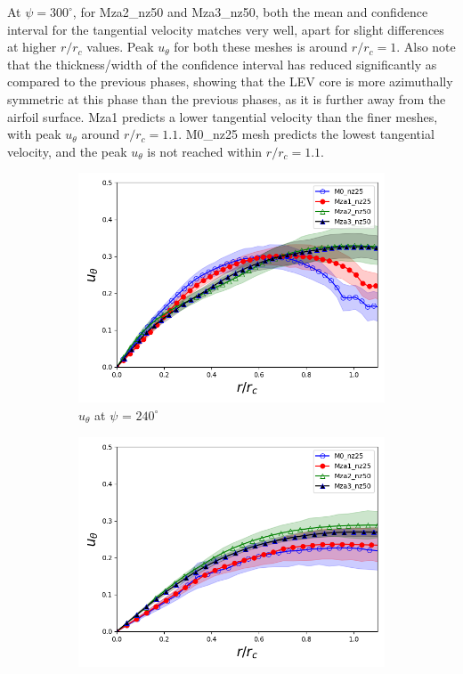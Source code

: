 At $\psi = 300^\circ$, for Mza2\_nz50 and Mza3\_nz50, both the mean and confidence interval for the tangential velocity matches very well, apart for slight differences at higher $r/r_c$ values. 
Peak $u_\theta$ for both these meshes is around $r/r_c= 1$.
Also note that the thickness/width of the confidence interval has reduced significantly as compared to the previous phases, showing that the LEV core is more azimuthally symmetric at this phase than the previous phases, as it is further away from the airfoil surface.
Mza1 predicts a lower tangential velocity than the finer meshes, with peak $u_\theta$ around $r/r_c= 1.1$. M0\_nz25 mesh predicts the lowest tangential velocity, and the peak $u_\theta$ is not reached within $r/r_c= 1.1$.

\begin{figure}[H]
	\centering
	\begin{subfigure}[b]{0.475\textwidth}
	\centering
	\includegraphics[width=1\textwidth]{figures/zonal_adapt_results/LEV/u_theta/phase_240.png}
	\caption{ $u_\theta$ at $\psi$ = $240^\circ$}
	\label{fig:zonal_utheta_240}
	\end{subfigure}
	\begin{subfigure}[b]{0.475\textwidth}
	\centering
	\includegraphics[width=1\textwidth]{figures/zonal_adapt_results/LEV/u_theta/phase_270.png}

\end{subfigure}
\end{figure}
